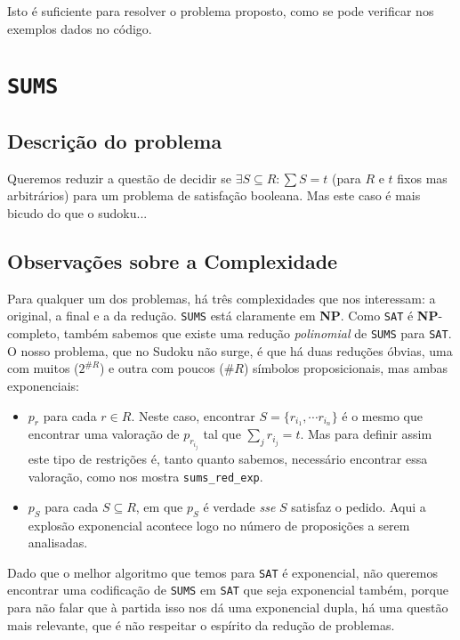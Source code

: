 \documentclass[a4paper,12pt]{article}
\theoremstyle{definition}
\theoremstyle{theorem}
\theoremstyle{remark}
\newcommand{\sums}{\texttt{SUMS}\xspace}
\newcommand{\sat}{\texttt{SAT}\xspace}
\newcommand{\np}{\textbf{NP}\xspace}
\newcommand{\code}[1]{\texttt{#1}}
\begin{document}
Isto é suficiente para resolver o problema proposto, como se pode verificar nos
exemplos dados no código.

\section{\sums}
\subsection{Descrição do problema}
Queremos reduzir a questão de decidir se $\exists S\subseteq R : \sum S = t$
(para $R$ e $t$ fixos mas arbitrários) para um problema de satisfação booleana.
Mas este caso
é mais bicudo do
que o sudoku...

\subsection{Observações sobre a Complexidade}
Para qualquer um dos problemas, há três complexidades que nos interessam: a
original, a final e a da redução. 
\sums está claramente em \np. Como \sat é \np-completo, também sabemos que
existe uma redução \emph{polinomial} de \sums para \sat.
O nosso problema, que
no Sudoku não surge, é que há duas reduções
óbvias, uma com muitos ($2^{\#R}$) e outra com poucos ($\#R$) símbolos
proposicionais, mas ambas
exponenciais:
\begin{itemize}
   \item $p_r$ para cada $r\in R$. Neste caso, encontrar
      $S=\{r_{i_1},\cdots r_{i_n}\}$ é o mesmo que encontrar uma valoração
      de $p_{r_{i_j}}$ tal que $\sum_j r_{i_j}=t$.
      Mas para definir assim este tipo de restrições é, tanto quanto sabemos,
      necessário
      encontrar essa valoração, como nos mostra \code{sums\_red\_exp}.

   \item $p_S$ para cada $S\subseteq R$, em que $p_S$ 
      é verdade \emph{sse} $S$ satisfaz o pedido.
      Aqui a explosão exponencial acontece logo no número de proposições a
      serem analisadas.
\end{itemize}

Dado que o melhor algoritmo que temos para \sat é exponencial, não queremos
encontrar uma codificação de \sums em \sat que seja exponencial também, porque
para não falar que à partida isso nos dá uma exponencial dupla, há uma
questão mais relevante, que é não respeitar o espírito da redução de problemas.
\end{document}
